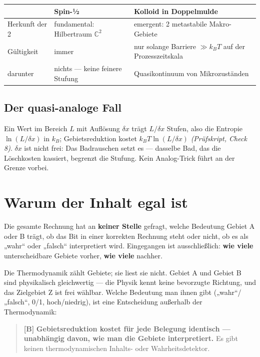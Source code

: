 \begin{center}
\small
\begin{tabular}{@{}p{}p{}p{}@{}}
\toprule
 & \textbf{Spin-½} & \textbf{Kolloid in Doppelmulde} \\
\midrule
Herkunft der 2 & fundamental: Hilbertraum $\mathbb{C}^2$ & emergent: 2 metastabile Makro-Gebiete \\
Gültigkeit & immer & nur solange Barriere $\gg k_B T$ auf der Prozesszeitskala \\
darunter & nichts --- keine feinere Stufung & Quasikontinuum von Mikrozuständen \\
\bottomrule
\end{tabular}
\end{center}

\subsection{Der quasi-analoge Fall}

Ein Wert im Bereich $L$ mit Auflösung $\delta x$ trägt $L/\delta x$ Stufen, also die Entropie $\ln(L/\delta x)$ in $k_B$;
Gebietsreduktion kostet $k_B T \ln(L/\delta x)$ \emph{(Prüfskript, Check 8)}. $\delta x$ ist
nicht frei: Das Badrauschen setzt es --- dasselbe Bad, das die Löschkosten
kassiert, begrenzt die Stufung. Kein Analog-Trick führt an der Grenze vorbei.

\section{Warum der Inhalt egal ist}
\label{sec:inhalt}

Die gesamte Rechnung hat an \textbf{keiner Stelle} gefragt, welche Bedeutung
Gebiet A oder B trägt, ob das Bit in einer korrekten Rechnung steht oder nicht, ob
es als „wahr“ oder „falsch“ interpretiert wird. Eingegangen ist ausschließlich:
\textbf{wie viele} unterscheidbare Gebiete vorher, \textbf{wie viele} nachher.

Die Thermodynamik zählt Gebiete; sie liest sie nicht. Gebiet A und Gebiet B sind
physikalisch gleichwertig --- die Physik kennt keine bevorzugte Richtung, und das
Zielgebiet Z ist frei wählbar. Welche Bedeutung man ihnen gibt („wahr“/„falsch“,
0/1, hoch/niedrig), ist eine Entscheidung außerhalb der Thermodynamik:

\begin{quote}
\textbf{[B]} \textbf{Gebietsreduktion kostet für jede Belegung identisch --- unabhängig
davon, wie man die Gebiete interpretiert.} Es gibt keinen thermodynamischen
Inhalts- oder Wahrheitsdetektor.
\end{quote}

